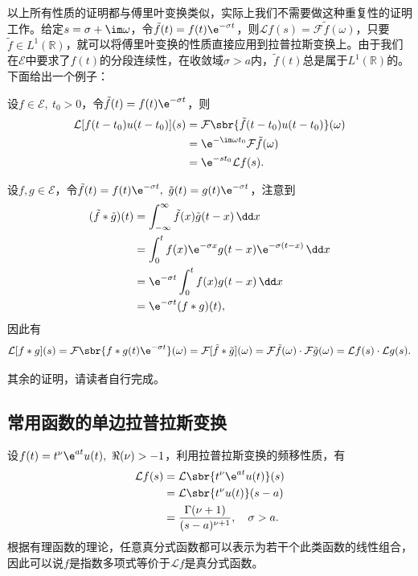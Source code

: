 以上所有性质的证明都与傅里叶变换类似，实际上我们不需要做这种重复性的证明工作。给定$s=\sigma+\im\omega$，令$\tilde{f}(t)=f(t)\e^{-\sigma t}$，则$\mathcal{L}f(s)=\mathcal{F}\tilde{f}(\omega)$，只要$\tilde{f}\in L^1(\mathbb{R})$，就可以将傅里叶变换的性质直接应用到拉普拉斯变换上。由于我们在$\mathcal{E}$中要求了$f(t)$的分段连续性，在收敛域$\sigma>a$内，$\tilde{f}(t)$总是属于$L^1(\mathbb{R})$的。下面给出一个例子：
\begin{example}[时移性质]
    设$f\in\mathcal{E},\ t_0>0$，令$\tilde{f}(t)=f(t)\e^{-\sigma t}$，则
    \begin{align}
        \mathcal{L}[f(t-t_0)u(t-t_0)](s)&=\mathcal{F}\sbr{\tilde{f}(t-t_0)u(t-t_0)}(\omega)\nonumber\\
        &=\e^{-\im\omega t_0}\mathcal{F}\tilde{f}(\omega)\nonumber\\
        &=\e^{-st_0}\mathcal{L}f(s).
    \end{align}
\end{example}
\begin{example}[卷积定理]
    设$f,g\in\mathcal{E}$，令$\tilde{f}(t)=f(t)\e^{-\sigma t},\ \tilde{g}(t)=g(t)\e^{-\sigma t}$，注意到
    \begin{align}
        (\tilde{f}*\tilde{g})(t)&=\int_{-\infty}^{\infty}\tilde{f}(x)\tilde{g}(t-x)\,\dd x\nonumber\\
        &=\int_0^{t}f(x)\e^{-\sigma x}g(t-x)\e^{-\sigma(t-x)}\,\dd x\nonumber\\
        &=\e^{-\sigma t}\int_0^{t}f(x)g(t-x)\,\dd x\nonumber\\
        &=\e^{-\sigma t}(f*g)(t),
    \end{align}
    因此有
    \begin{equation}
        \mathcal{L}[f*g](s)=\mathcal{F}\sbr{f*g(t)\e^{-\sigma t}}(\omega)=\mathcal{F}[\tilde{f}*\tilde{g}](\omega)=\mathcal{F}\tilde{f}(\omega)\cdot\mathcal{F}\tilde{g}(\omega)=\mathcal{L}f(s)\cdot\mathcal{L}g(s).
    \end{equation}
\end{example}
其余的证明，请读者自行完成。

\subsection{常用函数的单边拉普拉斯变换}\label{sub:ordinary_laplace}

\begin{example}[指数多项式]
    设$f(t)=t^\nu \e^{at}u(t),\ \Re(\nu)>-1$，利用拉普拉斯变换的频移性质，有
    \begin{align}
        \mathcal{L}f(s)&=\mathcal{L}\sbr{t^\nu \e^{at}u(t)}(s)\nonumber\\
        &=\mathcal{L}\sbr{t^\nu u(t)}(s-a)\nonumber\\
        &=\frac{\Gamma(\nu+1)}{(s-a)^{\nu+1}},\quad \sigma>a.
    \end{align}
    根据有理函数的理论，任意真分式函数都可以表示为若干个此类函数的线性组合，因此可以说$f$是指数多项式等价于$\mathcal{L}f$是真分式函数。
\end{example}

